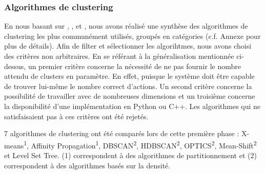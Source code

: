 \documentclass{llncs}
\begin{document}
\subsubsection{Algorithmes de clustering}

En nous basant sur \cite{Xu2015}, \cite{Andreopoulos2009}, \cite{Fahad2014} et \cite{Sajana2016}, nous avons réalisé une synthèse des algorithmes de clustering les plus communément utilisés, groupés en catégories (c.f. Annexe pour plus de détails). Afin de filter et sélectionner les algorihtmes, nous avons choisi des critères non arbitraires. En se référant à la généralisation mentionnée ci-dessus, un premier critère concerne la nécessité de ne pas fournir le nombre attendu de clusters en paramètre. En effet, puisque le système doit être capable de trouver lui-même le nombre correct d'actions. Un second critère concerne la possibilité de travailler avec de nombreuses dimensions et un troisième concerne la disponibilité d'une implémentation en Python ou C++. Les algorithmes qui ne satisfaisaient pas à ces critères ont été rejetés.

7 algorithmes de clustering ont été comparés lors de cette première phase : X-means\textsuperscript{1}, Affinity Propagation\textsuperscript{1}, DBSCAN\textsuperscript{2}, HDBSCAN\textsuperscript{2}, OPTICS\textsuperscript{2}, Mean-Shift\textsuperscript{2} et Level Set Tree. (1) correspondent à des algorithmes de partitionnement et (2) correspondent à des algorithmes basés sur la densité.


\end{document}
